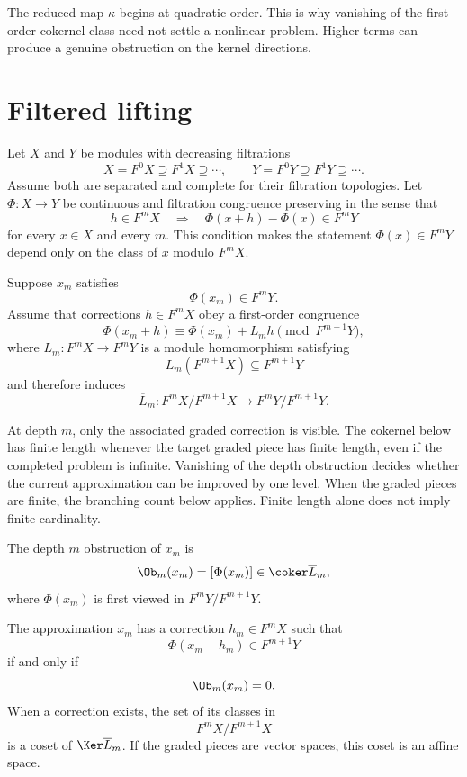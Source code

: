 \begin{remark}\label{rem:higher_obstruction}
The reduced map $\kappa$ begins at quadratic order.  This is why vanishing of the first-order cokernel class need not settle a nonlinear problem.  Higher terms can produce a genuine obstruction on the kernel directions.
\end{remark}

\section{Filtered lifting}\label{sec:filtered_lifting}

Let $X$ and $Y$ be modules with decreasing filtrations
\[
X=F^0X\supseteq F^1X\supseteq\cdots,
\qquad
Y=F^0Y\supseteq F^1Y\supseteq\cdots.
\]
Assume both are separated and complete for their filtration topologies.  Let $\Phi:X\to Y$ be continuous and filtration congruence preserving in the sense that
\[
h\in F^mX
\quad\Longrightarrow\quad
\Phi(x+h)-\Phi(x)\in F^mY
\]
for every $x\in X$ and every $m$.  This condition makes the statement $\Phi(x)\in F^mY$ depend only on the class of $x$ modulo $F^mX$.

Suppose $x_m$ satisfies
\[
\Phi(x_m)\in F^mY.
\]
Assume that corrections $h\in F^mX$ obey a first-order congruence
\[
\Phi(x_m+h)
\equiv
\Phi(x_m)+L_mh
\pmod{F^{m+1}Y},
\]
where $L_m:F^mX\to F^mY$ is a module homomorphism satisfying
\[
L_m(F^{m+1}X)\subseteq F^{m+1}Y
\]
and therefore induces
\[
\overline L_m:
F^mX/F^{m+1}X
\longrightarrow
F^mY/F^{m+1}Y.
\]


At depth $m$, only the associated graded correction is visible. The cokernel below has finite length whenever the target graded piece has finite length, even if the completed problem is infinite. Vanishing of the depth obstruction decides whether the current approximation can be improved by one level. When the graded pieces are finite, the branching count below applies. Finite length alone does not imply finite cardinality.

\begin{definition}\label{def:depth_obstruction}
The depth $m$ obstruction of $x_m$ is
\[
\Ob_m(x_m)
=
[\Phi(x_m)]
\in
\coker\overline L_m,
\]
where $\Phi(x_m)$ is first viewed in $F^mY/F^{m+1}Y$.
\end{definition}

\begin{theorem}\label{thm:one_step_lifting}
The approximation $x_m$ has a correction $h_m\in F^mX$ such that
\[
\Phi(x_m+h_m)\in F^{m+1}Y
\]
if and only if
\[
\Ob_m(x_m)=0.
\]
When a correction exists, the set of its classes in
\[
F^mX/F^{m+1}X
\]
is a coset of $\Ker\overline L_m$.  If the graded pieces are vector spaces, this coset is an affine space.
\end{theorem}

